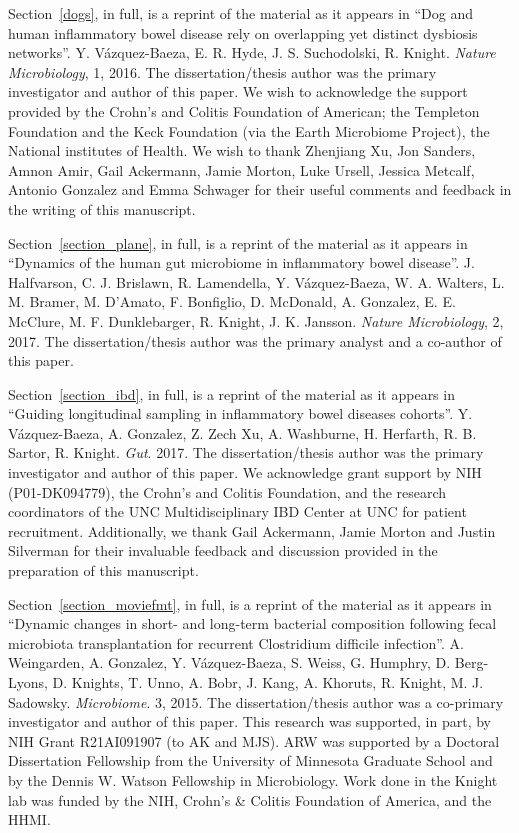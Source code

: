 \begin{frontmatter}
\begin{acknowledgements}
    Section~\ref{dogs}, in full, is a reprint of the material as it appears in 
    ``Dog and human inflammatory bowel disease rely on overlapping yet distinct 
    dysbiosis networks''. Y. V\'azquez-Baeza, E. R. Hyde, J. S.  Suchodolski, 
    R. Knight.  \emph{Nature Microbiology}, 1, 2016. The dissertation/thesis 
    author was the primary investigator and author of this paper. We wish to 
    acknowledge the support provided by the Crohn's and Colitis Foundation of 
    American; the Templeton Foundation and the Keck Foundation (via the Earth 
    Microbiome Project), the National institutes of Health. We wish to thank 
    Zhenjiang Xu, Jon Sanders, Amnon Amir, Gail Ackermann, Jamie Morton, Luke 
    Ursell, Jessica Metcalf, Antonio Gonzalez and Emma Schwager for their 
    useful comments and feedback in the writing of this manuscript. 

    Section~\ref{section_plane}, in full, is a reprint of the material as it 
    appears in ``Dynamics of the human gut microbiome in inflammatory bowel 
    disease''.  J. Halfvarson, C. J. Brislawn, R. Lamendella, Y.  
    V\'azquez-Baeza, W. A. Walters, L. M. Bramer, M. D'Amato, F.  Bonfiglio, D.  
    McDonald, A. Gonzalez, E. E. McClure, M. F. Dunklebarger, R. Knight, J.  K.  
    Jansson. \emph{Nature Microbiology}, 2, 2017. The dissertation/thesis 
    author was the primary analyst and a co-author of this paper.

    Section~\ref{section_ibd}, in full, is a reprint of the material as it 
    appears in ``Guiding longitudinal sampling in inflammatory bowel diseases 
    cohorts''. Y. V\'azquez-Baeza, A. Gonzalez, Z. Zech Xu, A. Washburne, H.  
    Herfarth, R.  B.  Sartor, R. Knight. \emph{Gut}. 2017. The 
    dissertation/thesis author was the primary investigator and author of this 
    paper. We acknowledge grant support by NIH (P01-DK094779), the Crohn's and 
    Colitis Foundation, and the research coordinators of the UNC 
    Multidisciplinary IBD Center at UNC for patient recruitment. Additionally, 
    we thank Gail Ackermann, Jamie Morton and Justin Silverman for their 
    invaluable feedback and discussion provided in the preparation of this 
    manuscript.

    Section~\ref{section_moviefmt}, in full, is a reprint of the material as it 
    appears in ``Dynamic changes in short- and long-term bacterial composition 
    following fecal microbiota transplantation for recurrent Clostridium 
    difficile infection''.  A. Weingarden, A. Gonzalez, Y.  V\'azquez-Baeza, S.  
    Weiss, G.  Humphry, D. Berg-Lyons, D. Knights, T.  Unno, A. Bobr, J.  Kang, 
    A. Khoruts, R. Knight, M. J. Sadowsky. \emph{Microbiome}. 3, 2015.  The 
    dissertation/thesis author was a co-primary investigator and author of this 
    paper. This research was supported, in part, by NIH Grant R21AI091907 (to 
    AK and MJS). ARW was supported by a Doctoral Dissertation Fellowship from 
    the University of Minnesota Graduate School and by the Dennis W.  Watson 
    Fellowship in Microbiology. Work done in the Knight lab was funded by the 
    NIH, Crohn's \& Colitis Foundation of America, and the HHMI.  


\end{acknowledgements}
\end{frontmatter}
